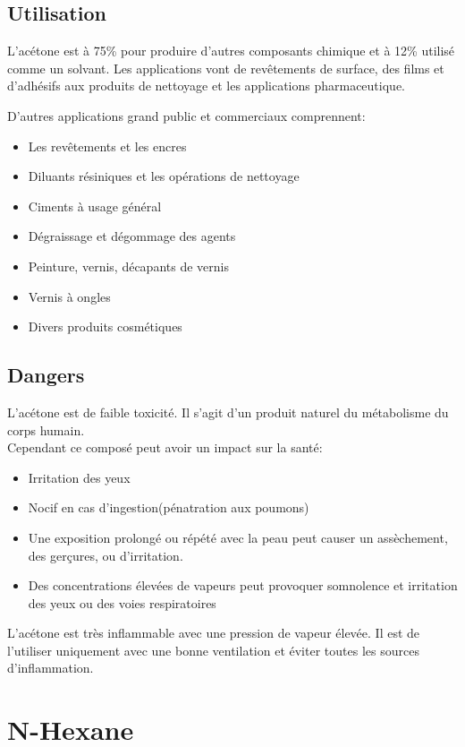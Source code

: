 \subsection{Utilisation}
L'acétone est à 75\% pour produire d'autres composants chimique et à 12\% utilisé comme un solvant. Les applications vont de revêtements de surface, des films et d'adhésifs aux produits de nettoyage et les applications pharmaceutique.


D'autres applications grand public et commerciaux comprennent:

\begin{itemize}
\item Les revêtements et les encres
\item Diluants résiniques et les opérations de nettoyage
\item Ciments à usage général
\item Dégraissage et dégommage des agents
\item Peinture, vernis, décapants de vernis
\item Vernis à ongles
\item Divers produits cosmétiques
\end{itemize}

\subsection{Dangers}
L'acétone est de faible toxicité. Il s'agit d'un produit naturel du métabolisme du corps humain.\\
Cependant ce composé peut avoir un impact sur la santé:
\begin{itemize}
\item Irritation des yeux
\item Nocif en cas d'ingestion(pénatration aux poumons)
\item Une exposition prolongé ou répété avec la peau peut causer un assèchement, des gerçures, ou d'irritation.
\item Des concentrations élevées de vapeurs peut provoquer somnolence et irritation des yeux ou des voies respiratoires

\end{itemize}

L'acétone est très inflammable avec une pression de vapeur élevée. Il est de l'utiliser uniquement avec une bonne ventilation et éviter toutes les sources d'inflammation.


\section{N-Hexane}
